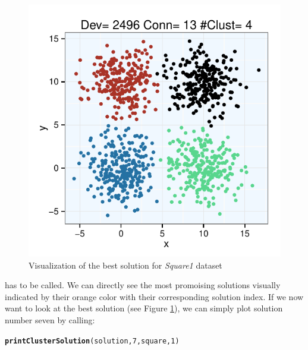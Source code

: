 \documentclass[parskip=half,DIV=14]{scrartcl}\usepackage[]{graphicx}\usepackage[]{color}
\makeatletter
\def\maxwidth{ %
  \ifdim\Gin@nat@width>\linewidth
    \linewidth
  \else
    \Gin@nat@width
  \fi
}
\newcommand{\hlnum}[1]{\textcolor[rgb]{0.686,0.059,0.569}{#1}}%
\newcommand{\hlstd}[1]{\textcolor[rgb]{0.345,0.345,0.345}{#1}}%
\newcommand{\hlkwd}[1]{\textcolor[rgb]{0.737,0.353,0.396}{\textbf{#1}}}%
\newenvironment{kframe}{%
 \def\at@end@of@kframe{}%
 \ifinner\ifhmode%
  \def\at@end@of@kframe{\end{minipage}}%
  \begin{minipage}{\columnwidth}%
 \fi\fi%
 \def\FrameCommand##1{\hskip\@totalleftmargin \hskip-\fboxsep
 \colorbox{shadecolor}{##1}\hskip-\fboxsep
     \hskip-\linewidth \hskip-\@totalleftmargin \hskip\columnwidth}%
 \MakeFramed {\advance\hsize-\width
   \@totalleftmargin\z@ \linewidth\hsize
   \@setminipage}}%
 {\par\unskip\endMakeFramed%
 \at@end@of@kframe}
\newenvironment{knitrout}{}{} %
\makeatother
\begin{document}
\begin{figure}
\begin{center}
\begin{knitrout}
\color{fgcolor}

{\centering \includegraphics[width=\maxwidth]{figures/plots-clusterSolutions-1} 

}



\end{knitrout}
\caption{Visualization of the best solution for \textit{Square1} dataset}
\label{fig:best}
\end{center}
\end{figure}
has to be called. We can directly see the most promoising solutions visually indicated by their orange color with their corresponding solution index. If we now want to look at the best solution (see Figure \ref{fig:best}), we can simply plot solution number seven by calling:
\begin{knitrout}
\color{fgcolor}\begin{kframe}
\begin{alltt}
\hlkwd{printClusterSolution}\hlstd{(solution,}\hlnum{7}\hlstd{,square,}\hlnum{1}\hlstd{)}
\end{alltt}
\end{kframe}
\end{knitrout}
\end{document}
